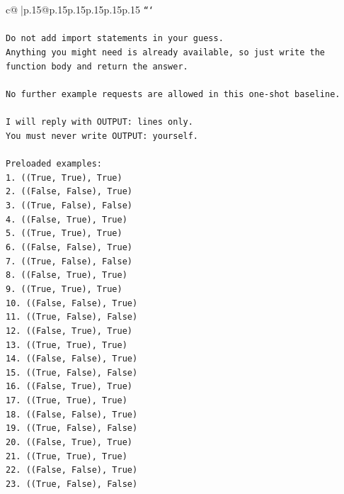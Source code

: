 \documentclass{article}
\begin{document}
{\begin{supertabular}{c@{$\;$}|p{.15\linewidth}@{}p{.15\linewidth}p{.15\linewidth}p{.15\linewidth}p{.15\linewidth}p{.15\linewidth}}
{{{\texttt{```} \\
\\ 
\texttt{Do not add import statements in your guess.} \\
\texttt{Anything you might need is already available, so just write the function body and return the answer.} \\
\\ 
\texttt{No further example requests are allowed in this one{-}shot baseline.} \\
\\ 
\texttt{I will reply with OUTPUT: lines only.} \\
\texttt{You must never write OUTPUT: yourself.} \\
\\ 
\texttt{Preloaded examples:} \\
\texttt{1. ((True, True), True)} \\
\texttt{2. ((False, False), True)} \\
\texttt{3. ((True, False), False)} \\
\texttt{4. ((False, True), True)} \\
\texttt{5. ((True, True), True)} \\
\texttt{6. ((False, False), True)} \\
\texttt{7. ((True, False), False)} \\
\texttt{8. ((False, True), True)} \\
\texttt{9. ((True, True), True)} \\
\texttt{10. ((False, False), True)} \\
\texttt{11. ((True, False), False)} \\
\texttt{12. ((False, True), True)} \\
\texttt{13. ((True, True), True)} \\
\texttt{14. ((False, False), True)} \\
\texttt{15. ((True, False), False)} \\
\texttt{16. ((False, True), True)} \\
\texttt{17. ((True, True), True)} \\
\texttt{18. ((False, False), True)} \\
\texttt{19. ((True, False), False)} \\
\texttt{20. ((False, True), True)} \\
\texttt{21. ((True, True), True)} \\
\texttt{22. ((False, False), True)} \\
\texttt{23. ((True, False), False)} \\
}}}
\end{supertabular}}
\end{document}
